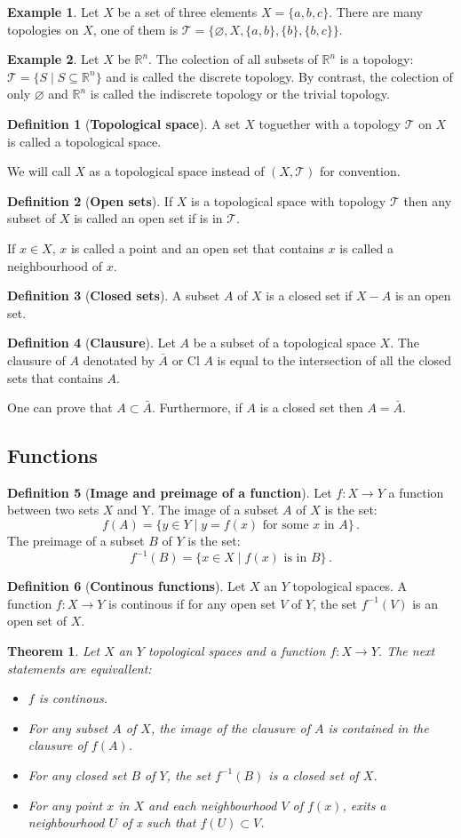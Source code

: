 \documentclass[10pt, letterpaper, oneside]{book}
\theoremstyle{theorem} %
\newtheorem{theorem}{Theorem}%
\theoremstyle{theorem} %
\theoremstyle{definition}
\newtheorem{definition}{Definition}%
\theoremstyle{remark}
\theoremstyle{definition}
\newtheorem{example}{Example}%
\theoremstyle{definition}
\theoremstyle{theorem}
\def\Re{\mathbb{R}}
\def\bth{\begin{theorem}}
\def\eth{\end{theorem}}
\def\bde{\begin{definition}}
\def\ede{\end{definition}}
\def\bex{\begin{example}}
\def\eex{\end{example}}
\begin{document}
\bex
Let $X$ be a set of three elements $X=\{a,b,c\}$. There are many topologies on $X$, one of them is $\mathscr{T}=\{\varnothing, X,\{a,b\},\{b\},\{b,c\} \}$.
\eex

\bex
Let $X$ be $\Re^n$. The colection of all subsets of $\Re^n$ is a topology: $\mathscr{T}=\{S \mid S\subseteq \Re^n\}$ and is called the discrete topology. By contrast, the colection of only $\varnothing$ and $\Re^n$ is called the indiscrete topology or the trivial topology.
\eex

\bde[\bf Topological space]
A set $X$ toguether with a topology $\mathscr{T}$ on $X$ is called a topological space.
\ede

We will call $X$ as a topological space instead of $(X,\mathscr{T})$ for convention. 

\bde[\bf Open sets]
If $X$ is a topological space with topology $\mathscr{T}$ then any subset of $X$ is called an open set if is in $\mathscr{T}$.
\ede

If $x\in X$, $x$ is called a point and an open set that contains $x$ is called a neighbourhood of $x$. 

\bde[\bf Closed sets]
A subset $A$ of $X$ is a closed set if $X-A$ is an open set.
\ede

\bde[\bf Clausure]
Let $A$ be a subset of a topological space $X$. The clausure of $A$ denotated by $\bar{A}$ or $\text{Cl }A$ is equal to the intersection of all the closed sets that contains $A$.
\ede

One can prove that $A\subset \bar{A}$. Furthermore, if $A$ is a closed set then $A=\bar{A}$.

\subsection*{Functions}
\bde[\bf Image and preimage of a function]
Let $f:X\to Y$ a function between two sets $X$ and Y. The image of a subset $A$ of $X$ is the set:
$$ f(A)=\{y\in Y \mid y=f(x) \text{ for some } x \text{ in } A \}\,.$$
The preimage of a subset $B$ of $Y$ is the set:
$$ f^{-1}(B)=\{x\in X \mid f(x) \text{ is in } B \}\,.$$

\ede

\bde[\bf Continous functions]
Let $X$ an $Y$ topological spaces. A function $f:X\to Y$ is continous if for any open set $V$ of $Y$, the set $f^{-1}(V)$ is an open set of $X$.
\ede

\bth
\rm
Let $X$ an $Y$ topological spaces and a function $f:X\to Y$. The next statements are equivallent:
\begin{itemize}
	\item[(a)] $f$ is continous.
	\item[(b)] For any subset $A$ of $X$, the image of the clausure of $A$ is contained in the clausure of $f(A)$.
	\item[(c)] For any closed set $B$ of $Y$, the set $f^{-1}(B)$ is a closed set of $X$.
	\item[(d)] For any point $x$ in $X$ and each neighbourhood $V$ of $f(x)$, exits a neighbourhood $U$ of x such that $f(U)\subset V$.
\end{itemize}
\eth
\end{document}
